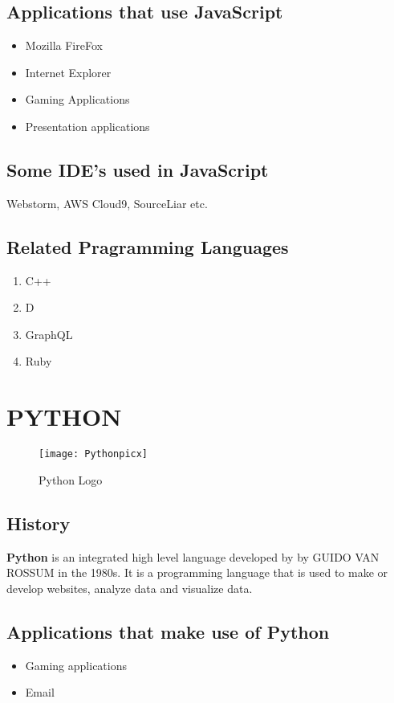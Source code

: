 \documentclass{article}
\begin{document}
         \subsection{Applications that use JavaScript}
         \begin{itemize}
         	\item Mozilla FireFox
         	\item Internet Explorer
         	\item Gaming Applications
         	\item Presentation applications
         \end{itemize}
         \subsection{Some IDE's used in JavaScript}
         Webstorm, AWS Cloud9, SourceLiar etc.
         \subsection{Related Pragramming Languages}
         \begin{enumerate}
         	\item C++
         	\item D
         	\item GraphQL
         	\item Ruby
         \end{enumerate}
     \pagebreak
     \section{PYTHON}
     \centering
\begin{figure}[t]
	\texttt{[image: Pythonpicx]}
	\caption{Python Logo}
	\label{Phthon Logo}
\end{figure}
           \subsection{History}
           \textbf{Python} is an integrated high level language developed by by GUIDO VAN ROSSUM in the 1980s. It is a programming language that is used to make or develop websites, analyze data and visualize data.
           \subsection{Applications that make use of Python}
           \begin{itemize}
           	\item Gaming applications
           	\item Email
           \end{itemize}
\end{document}
